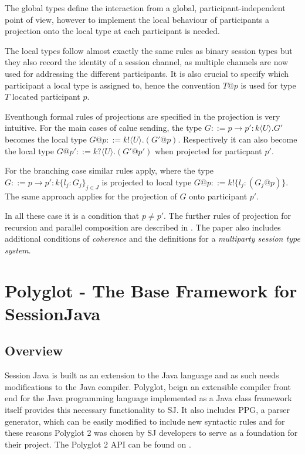 The global types define the interaction from a global, participant-independent point of view, however to implement the local behaviour of participants a projection onto the local type at each participant is needed.

The local types follow almost exactly the same rules as binary session types but they also record the identity of a session channel, as multiple channels are now used for addressing the different participants. It is also crucial to specify which participant a local type is assigned to, hence the convention $ T @ p $  is used for type $T$ located participant $p$.

Eventhough formal rules of projections are specified in \cite{multiparty_sess_types} the projection is very intuitive. For the main cases of calue sending, the type $G ::= p \rightarrow p' : k \langle U \rangle . G'$ becomes the local type $G @ p ::= k! \langle U \rangle . (G' @ p)$. Respectively it can also become the local type $G @ p' ::= k? \langle U \rangle . (G' @ p')$ when projected for particpant $p'$.

For the branching case similar rules apply, where the type $G::= p \rightarrow p' : k \lbrace l_{j}:G_{j} \rbrace _{j \in J} $ is projected to local type $G @ p ::= k! \lbrace l_{j}: (G_{j} @ p) \rbrace$. The same approach applies for the projection of $G$ onto participant $p'$.

In all these case it is a condition that $p \neq p'$. The further rules of projection for recursion and parallel composition are described in \cite{multiparty_sess_types}. The paper also includes additional conditions of \textit{coherence} and the definitions for a \textit{multiparty session type system}.





\section{Polyglot - The Base Framework for SessionJava}
\label{sec:polyglot}

\subsection{Overview}
\label{subsec:polyglotoverview}
Session Java is built as an extension to the Java language and as such needs modifications to the Java compiler. Polyglot, beign an extensible compiler front end for the Java programming language implemented as a Java class framework \cite{polyglotonline} itself provides this necessary functionality to SJ. It also includes PPG, a parser generator, which can be easily modified to include new syntactic rules and for these reasons Polyglot 2 was chosen by SJ developers to serve as a foundation for their project. The Polyglot 2 API can be found on \cite{polyglotapi}.

